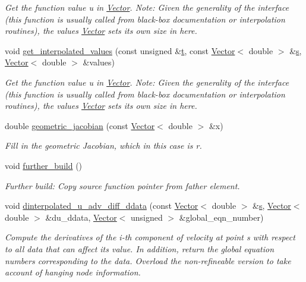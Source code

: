 \begin{DoxyCompactItemize}
\begin{DoxyCompactList}\small\item\em Get the function value u in \hyperlink{classoomph_1_1Vector}{Vector}. Note\+: Given the generality of the interface (this function is usually called from black-\/box documentation or interpolation routines), the values \hyperlink{classoomph_1_1Vector}{Vector} sets its own size in here. \end{DoxyCompactList}\item 
void \hyperlink{classoomph_1_1RefineableAxisymAdvectionDiffusionEquations_abacbd89407f04f0e98ce22cabbe43930}{get\+\_\+interpolated\+\_\+values} (const unsigned \&\hyperlink{cfortran_8h_af6f0bd3dc13317f895c91323c25c2b8f}{t}, const \hyperlink{classoomph_1_1Vector}{Vector}$<$ double $>$ \&\hyperlink{cfortran_8h_ab7123126e4885ef647dd9c6e3807a21c}{s}, \hyperlink{classoomph_1_1Vector}{Vector}$<$ double $>$ \&values)
\begin{DoxyCompactList}\small\item\em Get the function value u in \hyperlink{classoomph_1_1Vector}{Vector}. Note\+: Given the generality of the interface (this function is usually called from black-\/box documentation or interpolation routines), the values \hyperlink{classoomph_1_1Vector}{Vector} sets its own size in here. \end{DoxyCompactList}\item 
double \hyperlink{classoomph_1_1RefineableAxisymAdvectionDiffusionEquations_a5a2a06eb5a41ce5a06327d0637b60183}{geometric\+\_\+jacobian} (const \hyperlink{classoomph_1_1Vector}{Vector}$<$ double $>$ \&x)
\begin{DoxyCompactList}\small\item\em Fill in the geometric Jacobian, which in this case is r. \end{DoxyCompactList}\item 
void \hyperlink{classoomph_1_1RefineableAxisymAdvectionDiffusionEquations_aefeb49794d8a5d79e59c9d2145e60795}{further\+\_\+build} ()
\begin{DoxyCompactList}\small\item\em Further build\+: Copy source function pointer from father element. \end{DoxyCompactList}\item 
void \hyperlink{classoomph_1_1RefineableAxisymAdvectionDiffusionEquations_ac1883d916d0393b4c505ca6506513f39}{dinterpolated\+\_\+u\+\_\+adv\+\_\+diff\+\_\+ddata} (const \hyperlink{classoomph_1_1Vector}{Vector}$<$ double $>$ \&\hyperlink{cfortran_8h_ab7123126e4885ef647dd9c6e3807a21c}{s}, \hyperlink{classoomph_1_1Vector}{Vector}$<$ double $>$ \&du\+\_\+ddata, \hyperlink{classoomph_1_1Vector}{Vector}$<$ unsigned $>$ \&global\+\_\+eqn\+\_\+number)
\begin{DoxyCompactList}\small\item\em Compute the derivatives of the i-\/th component of velocity at point s with respect to all data that can affect its value. In addition, return the global equation numbers corresponding to the data. Overload the non-\/refineable version to take account of hanging node information. \end{DoxyCompactList}\end{DoxyCompactItemize}
